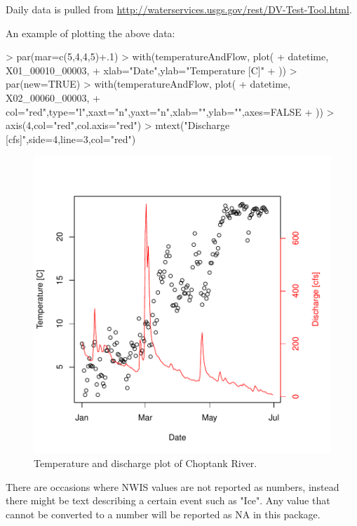 \documentclass[a4paper,11pt]{article}
\begin{document}
Daily data is pulled from \url{http://waterservices.usgs.gov/rest/DV-Test-Tool.html}. 

An example of plotting the above data:
\begin{Schunk}
\begin{Sinput}
> par(mar=c(5,4,4,5)+.1)
> with(temperatureAndFlow, plot(
+   datetime, X01_00010_00003,
+   xlab="Date",ylab="Temperature [C]"
+   ))
> par(new=TRUE)
> with(temperatureAndFlow, plot(
+   datetime, X02_00060_00003,
+   col="red",type="l",xaxt="n",yaxt="n",xlab="",ylab="",axes=FALSE
+   ))
> axis(4,col="red",col.axis="red")
> mtext("Discharge [cfs]",side=4,line=3,col="red")
\end{Sinput}
\end{Schunk}
\begin{figure}
\begin{center}
\includegraphics{dataRetrieval-fig1}
\end{center}
\caption{Temperature and discharge plot of Choptank River.}
\end{figure}

There are occasions where NWIS values are not reported as numbers, instead there might be text describing a certain event such as "Ice".  Any value that cannot be converted to a number will be reported as NA in this package.

\end{document}
